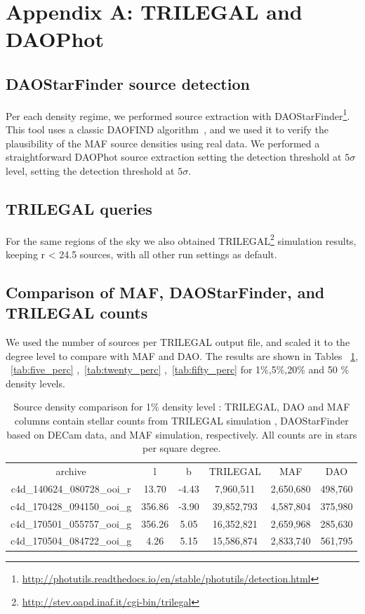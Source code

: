 \documentclass[DM,lsstdraft,toc,usenatbib]{lsstdoc}
\begin{document}
\appendix
\section{Appendix A: TRILEGAL and DAOPhot}
\label{sec:appendixA}


\subsection{DAOStarFinder source detection}
Per each density regime, we performed source extraction with DAOStarFinder\footnote{\url{http://photutils.readthedocs.io/en/stable/photutils/detection.html}}.  This tool uses a classic DAOFIND algorithm~\citep{stetson1987}, and  we used it to verify the plausibility of the MAF source densities using real data.  We performed a straightforward DAOPhot source extraction setting  the detection threshold at $5 \sigma$ level, setting the detection threshold at $5\sigma$. 

\subsection{TRILEGAL queries}
For the same regions of the sky we also  obtained TRILEGAL\footnote{\url{http://stev.oapd.inaf.it/cgi-bin/trilegal}} simulation results, keeping  r < 24.5  sources, with all other run settings as default.  


\subsection{Comparison of MAF, DAOStarFinder, and TRILEGAL counts}
We used the number of sources per TRILEGAL output file, and scaled it to the degree level to compare with MAF and DAO.  The results are shown in Tables ~\ref{tab:one_perc}, ~\ref{tab:five_perc} ,~\ref{tab:twenty_perc} ,~\ref{tab:fifty_perc} for 1\%,5\%,20\% and 50 \% density levels. 



\begin{table}
\begin{tabular}{cccccc}
archive & l & b & TRILEGAL & MAF & DAO \\
c4d\_140624\_080728\_ooi\_r & 13.70 & -4.43 & 7,960,511 & 2,650,680 & 498,760 \\
c4d\_170428\_094150\_ooi\_g & 356.86 & -3.90 & 39,852,793 & 4,587,804 & 375,980 \\
c4d\_170501\_055757\_ooi\_g & 356.26 & 5.05 & 16,352,821 & 2,659,968 & 285,630 \\
c4d\_170504\_084722\_ooi\_g & 4.26 & 5.15 & 15,586,874 & 2,833,740 & 561,795 \\
\end{tabular}
\caption{Source density comparison for 1\% density level : TRILEGAL, DAO and MAF columns contain stellar counts from TRILEGAL simulation , DAOStarFinder based on DECam data, and MAF simulation, respectively. All counts are in stars per square degree. }
\label{tab:one_perc}
\end{table}
 
\end{document}
